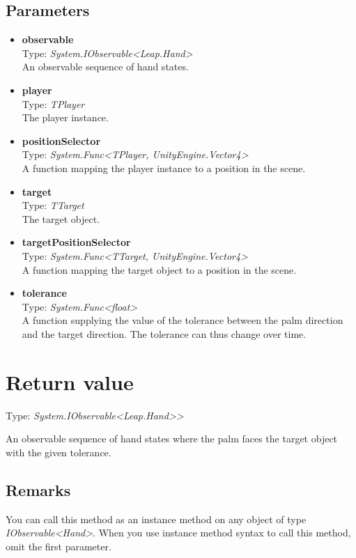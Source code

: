 \documentclass[12pt,a4paper,twoside]{report}
\begin{document}
\subsection{Parameters}
\begin{itemize}
    \item \textbf{observable} \\
    Type: \textit{System.IObservable<Leap.Hand>}\\
    An observable sequence of hand states.
    
    \item \textbf{player}\\
    Type: \textit{TPlayer}\\
    The player instance.
    
    \item \textbf{positionSelector}\\
    Type: \textit{System.Func<TPlayer, UnityEngine.Vector4>}\\
    A function mapping the player instance to a position in the scene.
    
    \item \textbf{target}\\
    Type: \textit{TTarget}\\
    The target object.
    
    \item \textbf{targetPositionSelector}\\
    Type: \textit{System.Func<TTarget, UnityEngine.Vector4>}\\
    A function mapping the target object to a position in the scene.
    
    \item \textbf{tolerance}\\
    Type: \textit{System.Func<float>}\\
    A function supplying the value of the tolerance between the palm direction and the target direction. The tolerance can thus change over time.

\end{itemize}

\section{Return value}
Type: \textit{System.IObservable<Leap.Hand>{}>}

An observable sequence of hand states where the palm faces the target object with the given tolerance.

\subsection{Remarks}
You can call this method as an instance method on any object of type \textit{IObservable<Hand>}. When you use 
instance method syntax to call this method, omit the first parameter.
\end{document}
